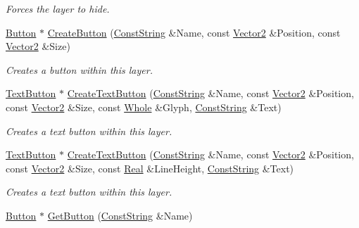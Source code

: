 \begin{DoxyCompactItemize}
\begin{DoxyCompactList}\small\item\em Forces the layer to hide. \item\end{DoxyCompactList}\item 
\hyperlink{classphys_1_1UI_1_1Button}{Button} $\ast$ \hyperlink{classphys_1_1UI_1_1Layer_a22fb2a442ecbaf85e7e216b204d07f21}{CreateButton} (\hyperlink{namespacephys_a5ce5049f8b4bf88d6413c47b504ebb31}{ConstString} \&Name, const \hyperlink{classphys_1_1Vector2}{Vector2} \&Position, const \hyperlink{classphys_1_1Vector2}{Vector2} \&Size)
\begin{DoxyCompactList}\small\item\em Creates a button within this layer. \item\end{DoxyCompactList}\item 
\hyperlink{classphys_1_1UI_1_1TextButton}{TextButton} $\ast$ \hyperlink{classphys_1_1UI_1_1Layer_ab8f427ee8bffc24bac27eae700d8cb6f}{CreateTextButton} (\hyperlink{namespacephys_a5ce5049f8b4bf88d6413c47b504ebb31}{ConstString} \&Name, const \hyperlink{classphys_1_1Vector2}{Vector2} \&Position, const \hyperlink{classphys_1_1Vector2}{Vector2} \&Size, const \hyperlink{namespacephys_a460f6bc24c8dd347b05e0366ae34f34a}{Whole} \&Glyph, \hyperlink{namespacephys_a5ce5049f8b4bf88d6413c47b504ebb31}{ConstString} \&Text)
\begin{DoxyCompactList}\small\item\em Creates a text button within this layer. \item\end{DoxyCompactList}\item 
\hyperlink{classphys_1_1UI_1_1TextButton}{TextButton} $\ast$ \hyperlink{classphys_1_1UI_1_1Layer_a559f7ae08fb6da07aa1c2b829f2a7070}{CreateTextButton} (\hyperlink{namespacephys_a5ce5049f8b4bf88d6413c47b504ebb31}{ConstString} \&Name, const \hyperlink{classphys_1_1Vector2}{Vector2} \&Position, const \hyperlink{classphys_1_1Vector2}{Vector2} \&Size, const \hyperlink{namespacephys_af7eb897198d265b8e868f45240230d5f}{Real} \&LineHeight, \hyperlink{namespacephys_a5ce5049f8b4bf88d6413c47b504ebb31}{ConstString} \&Text)
\begin{DoxyCompactList}\small\item\em Creates a text button within this layer. \item\end{DoxyCompactList}\item 
\hyperlink{classphys_1_1UI_1_1Button}{Button} $\ast$ \hyperlink{classphys_1_1UI_1_1Layer_a6331e3e7a049deba36aba957d0dcecd8}{GetButton} (\hyperlink{namespacephys_a5ce5049f8b4bf88d6413c47b504ebb31}{ConstString} \&Name)

\end{DoxyCompactItemize}
